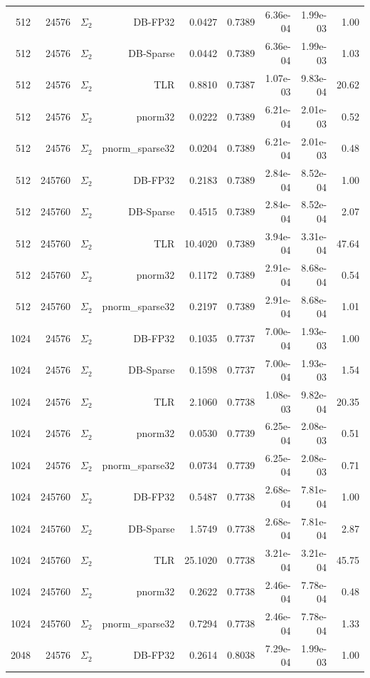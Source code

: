 \begin{tabular}{|r|r|r|r|r|r|r|r|r|}
  512 & 24576 & $\Sigma_2$ & DB-FP32 & 0.0427 & 0.7389 & 6.36e-04 & 1.99e-03 & 1.00 \\
  512 & 24576 & $\Sigma_2$ & DB-Sparse & 0.0442 & 0.7389 & 6.36e-04 & 1.99e-03 & 1.03 \\
  512 & 24576 & $\Sigma_2$ & TLR & 0.8810 & 0.7387 & 1.07e-03 & 9.83e-04 & 20.62 \\
  512 & 24576 & $\Sigma_2$ & pnorm32 & 0.0222 & 0.7389 & 6.21e-04 & 2.01e-03 & 0.52 \\
  512 & 24576 & $\Sigma_2$ & pnorm\_sparse32 & 0.0204 & 0.7389 & 6.21e-04 & 2.01e-03 & 0.48 \\
  512 & 245760 & $\Sigma_2$ & DB-FP32 & 0.2183 & 0.7389 & 2.84e-04 & 8.52e-04 & 1.00 \\
  512 & 245760 & $\Sigma_2$ & DB-Sparse & 0.4515 & 0.7389 & 2.84e-04 & 8.52e-04 & 2.07 \\
  512 & 245760 & $\Sigma_2$ & TLR & 10.4020 & 0.7389 & 3.94e-04 & 3.31e-04 & 47.64 \\
  512 & 245760 & $\Sigma_2$ & pnorm32 & 0.1172 & 0.7389 & 2.91e-04 & 8.68e-04 & 0.54 \\
  512 & 245760 & $\Sigma_2$ & pnorm\_sparse32 & 0.2197 & 0.7389 & 2.91e-04 & 8.68e-04 & 1.01 \\
  1024 & 24576 & $\Sigma_2$ & DB-FP32 & 0.1035 & 0.7737 & 7.00e-04 & 1.93e-03 & 1.00 \\
  1024 & 24576 & $\Sigma_2$ & DB-Sparse & 0.1598 & 0.7737 & 7.00e-04 & 1.93e-03 & 1.54 \\
  1024 & 24576 & $\Sigma_2$ & TLR & 2.1060 & 0.7738 & 1.08e-03 & 9.82e-04 & 20.35 \\
  1024 & 24576 & $\Sigma_2$ & pnorm32 & 0.0530 & 0.7739 & 6.25e-04 & 2.08e-03 & 0.51 \\
  1024 & 24576 & $\Sigma_2$ & pnorm\_sparse32 & 0.0734 & 0.7739 & 6.25e-04 & 2.08e-03 & 0.71 \\
  1024 & 245760 & $\Sigma_2$ & DB-FP32 & 0.5487 & 0.7738 & 2.68e-04 & 7.81e-04 & 1.00 \\
  1024 & 245760 & $\Sigma_2$ & DB-Sparse & 1.5749 & 0.7738 & 2.68e-04 & 7.81e-04 & 2.87 \\
  1024 & 245760 & $\Sigma_2$ & TLR & 25.1020 & 0.7738 & 3.21e-04 & 3.21e-04 & 45.75 \\
  1024 & 245760 & $\Sigma_2$ & pnorm32 & 0.2622 & 0.7738 & 2.46e-04 & 7.78e-04 & 0.48 \\
  1024 & 245760 & $\Sigma_2$ & pnorm\_sparse32 & 0.7294 & 0.7738 & 2.46e-04 & 7.78e-04 & 1.33 \\
  2048 & 24576 & $\Sigma_2$ & DB-FP32 & 0.2614 & 0.8038 & 7.29e-04 & 1.99e-03 & 1.00 \\

\end{tabular}
